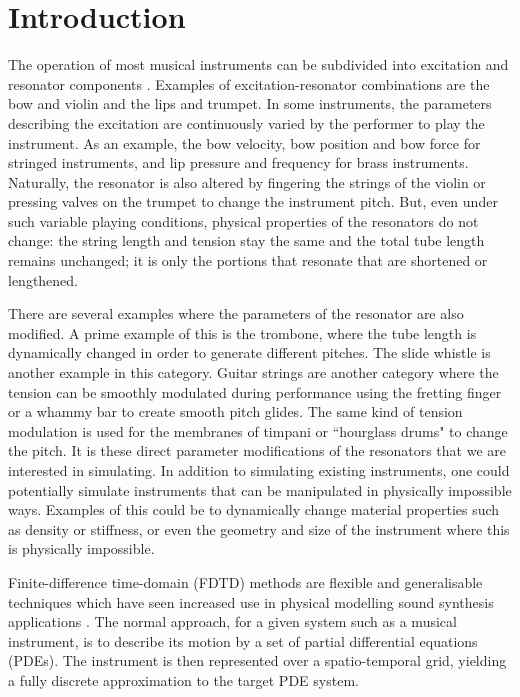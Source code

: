 \section{Introduction}
The operation of most musical instruments can be subdivided into excitation and resonator components \cite{Borin1989}. Examples of excitation-resonator combinations are the bow and violin and the lips and trumpet. In some instruments, the parameters describing the excitation are continuously varied by the performer to play the instrument. As an example, the bow velocity, bow position and bow force for stringed instruments, and lip pressure and frequency for brass instruments. Naturally, the resonator is also altered by fingering the strings of the violin or pressing valves on the trumpet to change the instrument pitch. But, even under such variable playing conditions, physical properties of the resonators do not change: the string length and tension stay the same and the total tube length remains unchanged; it is only the portions that resonate that are shortened or lengthened.

There are several examples where the parameters of the resonator are also modified. A prime example of this is the trombone, where the tube length is dynamically changed in order to generate different pitches. The slide whistle is another example in this category. Guitar strings are another category where the tension can be smoothly modulated during performance using the fretting finger or a whammy bar  %
to create smooth pitch glides. The same kind of tension modulation is used for the membranes of timpani or ``hourglass drums" to change the pitch. 
It is these direct parameter modifications of the resonators that we are interested in simulating. In addition to simulating existing instruments, one could potentially simulate instruments that can be manipulated in physically impossible ways. Examples of this could be to dynamically change material properties such as density or stiffness, or even the geometry and size of the instrument where this is physically impossible.

Finite-difference time-domain (FDTD) methods are flexible and generalisable techniques which have seen increased use in physical modelling sound synthesis applications \cite{bilbao2009}. The normal approach, for a given system such as a musical instrument, is to describe its motion by a set of partial differential equations (PDEs). The instrument is then represented over a spatio-temporal grid, yielding a fully discrete approximation to the target PDE system. 

